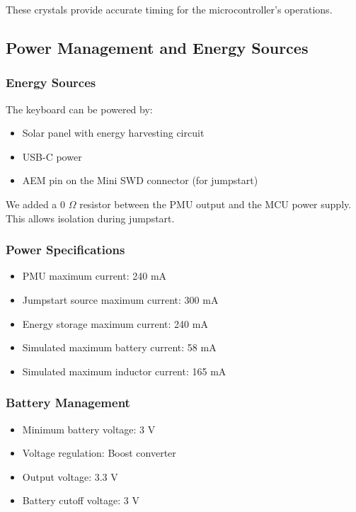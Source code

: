 \documentclass[a4paper,11pt]{article}%
\begin{document}
These crystals provide accurate timing for the microcontroller's operations.

\subsection{Power Management and Energy Sources}

\subsubsection{Energy Sources}

The keyboard can be powered by:

\begin{itemize}
    \item Solar panel with energy harvesting circuit
    \item USB-C power
    \item AEM pin on the Mini SWD connector (for jumpstart)
\end{itemize}

We added a 0 $\Omega$ resistor between the PMU output and the MCU power supply. This allows isolation during jumpstart.

\subsubsection{Power Specifications}

\begin{itemize}
    \item PMU maximum current: 240 mA
    \item Jumpstart source maximum current: 300 mA
    \item Energy storage maximum current: 240 mA
    \item Simulated maximum battery current: 58 mA
    \item Simulated maximum inductor current: 165 mA
\end{itemize}

\subsubsection{Battery Management}

\begin{itemize}
    \item Minimum battery voltage: 3 V
    \item Voltage regulation: Boost converter
    \item Output voltage: 3.3 V
    \item Battery cutoff voltage: 3 V
\end{itemize}
\end{document}
